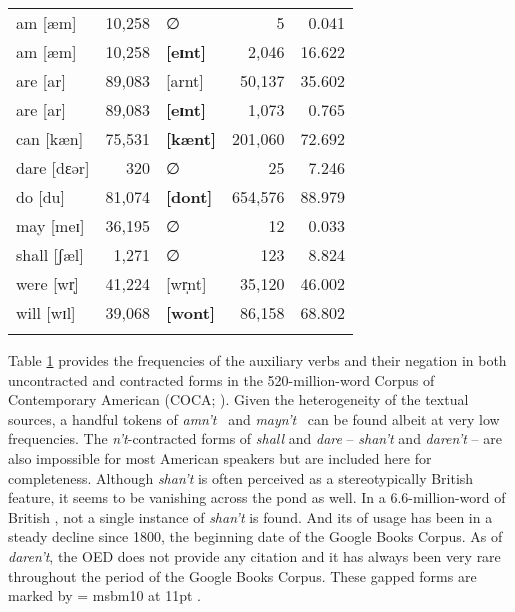 \documentclass[output=paper,
modfonts
]{LSP/langsci}
\begin{document}
\begin{table}[h!]
\begin{center}
\begin{tabularx}{\textwidth}{Xr X rr }
am  [æm] & 10,258 & ∅ & 5& 0.041  \\
am [æm] & 10,258  & {\textbf{[eɪnt]}} & 2,046 & 16.622 \\ 
are  [ar] &89,083 &  [arnt]  & 50,137 & 35.602\\
are  [ar] &89,083 &  {\textbf{[eɪnt]}}  & 1,073 & 0.765\\
can  [kæn]  & 75,531 &{\textbf{[kænt]}}  & 201,060 & 72.692\\
dare  [dɛər]& 320 & %
		∅			& 25 & 7.246 \\
do [du] & 81,074 & {\textbf{[dont]}} & 654,576 & 88.979\\
may  [meɪ] & 36,195 & ∅ & 12 & 0.033\\
shall [ʃæl]& 1,271 &   ∅ & 123 & 8.824 \\
were  [wr̩]& 41,224 & [wr̩nt] & 35,120 & 46.002  \\
will  [wɪl] & 39,068 & {\textbf{[wont]}} & 86,158 & 68.802 \\ 
\lspbottomrule
\end{tabularx} \label{t:amnt}\end{center}\end{table}

Table \ref{t:amnt} provides the frequencies of the auxiliary verbs and their
negation in both uncontracted and contracted forms in
the 520-million-word Corpus of Contemporary American  (COCA;
\citealt{COCA}).  Given the heterogeneity of the textual sources, a
handful tokens of \textit{amn't}~ and \textit{mayn't}~ can be found albeit at very
low frequencies. The \textit{n't}-contracted forms of \textit{  shall} and 
\textit{dare} -- \textit{shan't} and \textit{daren't} -- are also impossible for
most American  speakers but are included here for
completeness. Although \textit{shan't} is often perceived  as a
stereotypically British  feature, it 
seems to be vanishing across the pond as well. In  a 6.6-million-word
 of British  \citep{CHILDES}, not a single instance of
\textit{shan't} is found. And its  of usage has been in a steady
decline since 1800, the beginning date of the Google Books  Corpus. As
of \textit{  daren't}, the OED does not provide any citation and it has always
been very rare throughout the period of the Google Books Corpus. These
gapped forms are marked by \font\msbm = msbm10 at 11pt
\hbox{\msbm {}}.
\end{document}
